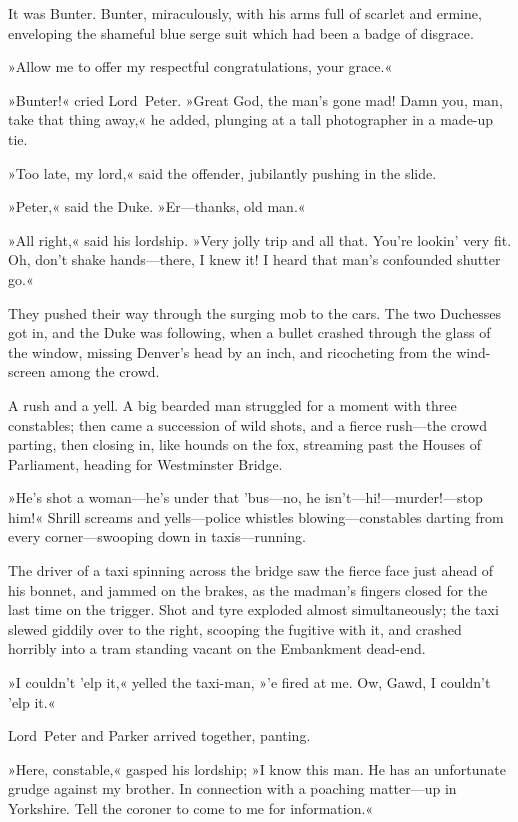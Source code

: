It was Bunter. Bunter, miraculously, with his arms full of scarlet and ermine, enveloping the shameful blue serge suit which had been a badge of disgrace.

»Allow me to offer my respectful congratulations, your grace.«

»Bunter!« cried Lord~Peter. »Great God, the man's gone mad! Damn you, man, take that thing away,« he added, plunging at a tall photographer in a made-up tie.

»Too late, my lord,« said the offender, jubilantly pushing in the slide.

»Peter,« said the Duke. »Er—thanks, old man.«

»All right,« said his lordship. »Very jolly trip and all that. You're lookin' very fit. Oh, don't shake hands—there, I knew it! I heard that man's confounded shutter go.«

They pushed their way through the surging mob to the cars. The two Duchesses got in, and the Duke was following, when a bullet crashed through the glass of the window, missing Denver's head by an inch, and ricocheting from the wind-screen among the crowd.

A rush and a yell. A big bearded man struggled for a moment with three constables; then came a succession of wild shots, and a fierce rush—the crowd parting, then closing in, like hounds on the fox, streaming past the Houses of Parliament, heading for Westminster Bridge.

»He's shot a woman—he's under that 'bus—no, he isn't—hi!—murder!\allowbreak—stop him!« Shrill screams and yells—police whistles blowing—constables darting from every corner—swooping down in taxis—running.

The driver of a taxi spinning across the bridge saw the fierce face just ahead of his bonnet, and jammed on the brakes, as the madman's fingers closed for the last time on the trigger. Shot and tyre exploded almost simultaneously; the taxi slewed giddily over to the right, scooping the fugitive with it, and crashed horribly into a tram standing vacant on the Embankment dead-end.

»I couldn't 'elp it,« yelled the taxi-man, »'e fired at me. Ow, Gawd, I couldn't 'elp it.«

Lord~Peter and Parker arrived together, panting.

»Here, constable,« gasped his lordship; »I know this man. He has an unfortunate grudge against my brother. In connection with a poaching matter—up in Yorkshire. Tell the coroner to come to me for information.«

